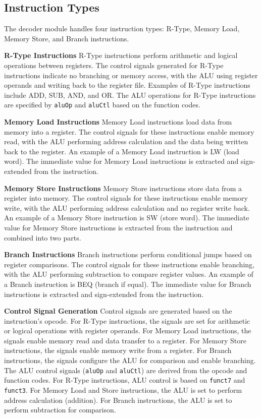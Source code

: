 \subsection{Instruction Types}
The decoder module handles four instruction types: R-Type, Memory Load, Memory Store, and Branch instructions.

\textbf{R-Type Instructions}
R-Type instructions perform arithmetic and logical operations between registers. The control signals generated for R-Type instructions indicate no branching or memory access, with the ALU using register operands and writing back to the register file. Examples of R-Type instructions include ADD, SUB, AND, and OR. The ALU operations for R-Type instructions are specified by \texttt{aluOp} and \texttt{aluCtl} based on the function codes.

\textbf{Memory Load Instructions}
Memory Load instructions load data from memory into a register. The control signals for these instructions enable memory read, with the ALU performing address calculation and the data being written back to the register. An example of a Memory Load instruction is LW (load word). The immediate value for Memory Load instructions is extracted and sign-extended from the instruction.

\textbf{Memory Store Instructions}
Memory Store instructions store data from a register into memory. The control signals for these instructions enable memory write, with the ALU performing address calculation and no register write back. An example of a Memory Store instruction is SW (store word). The immediate value for Memory Store instructions is extracted from the instruction and combined into two parts.

\textbf{Branch Instructions}
Branch instructions perform conditional jumps based on register comparisons. The control signals for these instructions enable branching, with the ALU performing subtraction to compare register values. An example of a Branch instruction is BEQ (branch if equal). The immediate value for Branch instructions is extracted and sign-extended from the instruction.

\textbf{Control Signal Generation}
Control signals are generated based on the instruction's opcode. For R-Type instructions, the signals are set for arithmetic or logical operations with register operands. For Memory Load instructions, the signals enable memory read and data transfer to a register. For Memory Store instructions, the signals enable memory write from a register. For Branch instructions, the signals configure the ALU for comparison and enable branching. The ALU control signals (\texttt{aluOp} and \texttt{aluCtl}) are derived from the opcode and function codes. For R-Type instructions, ALU control is based on \texttt{funct7} and \texttt{funct3}. For Memory Load and Store instructions, the ALU is set to perform address calculation (addition). For Branch instructions, the ALU is set to perform subtraction for comparison.


